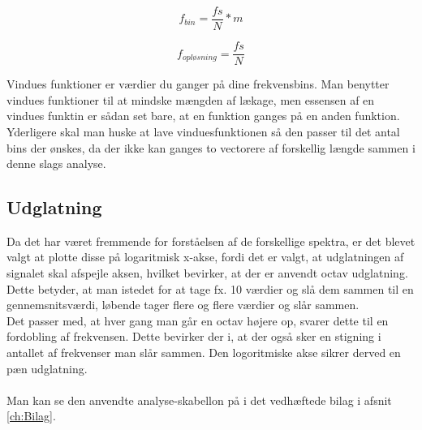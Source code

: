  \begin{equation}\label{eq:bins}
 f_{bin} = \frac{fs}{N}*m 
 \end{equation}

\begin{equation}\label{eq:bins}
f_{opløsning} = \frac{fs}{N} 
\end{equation}

Vindues funktioner er værdier du ganger på dine frekvensbins. Man benytter vindues funktioner til at mindske mængden af lækage, men essensen af en vindues funktin er sådan set bare, at en funktion ganges på en anden funktion. Yderligere skal man huske at lave vinduesfunktionen så den passer til det antal bins der ønskes, da der ikke kan ganges to vectorere af forskellig længde sammen i denne slags analyse.

\subsection{Udglatning}

Da det har været fremmende for forståelsen af de forskellige spektra, er det blevet valgt at plotte disse på logaritmisk x-akse, fordi det er valgt, at udglatningen af signalet skal afspejle aksen, hvilket bevirker, at der er anvendt octav udglatning. Dette betyder, at man istedet for at tage fx. 10 værdier og slå dem sammen til en gennemsnitsværdi, løbende tager flere og flere værdier og slår sammen. \\Det passer med, at hver gang man går en octav højere op, svarer dette til en fordobling af frekvensen. Dette bevirker der i, at der også sker en stigning i antallet af frekvenser man slår sammen. Den logoritmiske akse sikrer derved en pæn udglatning.
\\\\
Man kan se den anvendte analyse-skabellon på i det vedhæftede bilag i afsnit \ref{ch:Bilag}.



